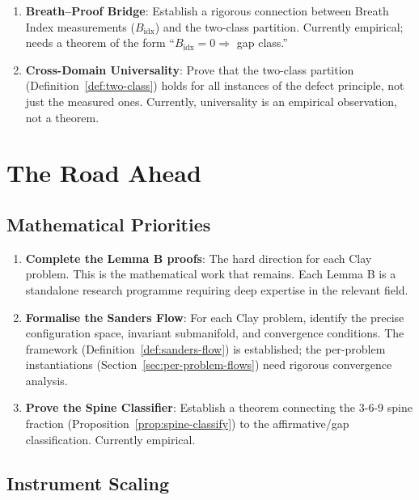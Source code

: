 \documentclass[12pt, openany]{book}
\theoremstyle{remark}
\begin{document}
\begin{enumerate}
  \item \textbf{Breath--Proof Bridge}: Establish a rigorous connection between
        Breath Index measurements ($B_{\mathrm{idx}}$) and the two-class partition.
        Currently empirical; needs a theorem of the form ``$B_{\mathrm{idx}} = 0
        \Rightarrow$ gap class.''

  \item \textbf{Cross-Domain Universality}: Prove that the two-class partition
        (Definition~\ref{def:two-class}) holds for all instances of the defect
        principle, not just the measured ones. Currently, universality is an
        empirical observation, not a theorem.
\end{enumerate}


\section{The Road Ahead}
\label{sec:road-ahead}

\subsection{Mathematical Priorities}

\begin{enumerate}
  \item \textbf{Complete the Lemma B proofs}: The hard direction for each Clay problem.
        This is the mathematical work that remains. Each Lemma B is a standalone
        research programme requiring deep expertise in the relevant field.
  \item \textbf{Formalise the Sanders Flow}: For each Clay problem, identify the
        precise configuration space, invariant submanifold, and convergence conditions.
        The framework (Definition~\ref{def:sanders-flow}) is established; the
        per-problem instantiations (Section~\ref{sec:per-problem-flows}) need
        rigorous convergence analysis.
  \item \textbf{Prove the Spine Classifier}: Establish a theorem connecting the
        3-6-9 spine fraction (Proposition~\ref{prop:spine-classify}) to the
        affirmative/gap classification. Currently empirical.
\end{enumerate}

\subsection{Instrument Scaling}
\end{document}

